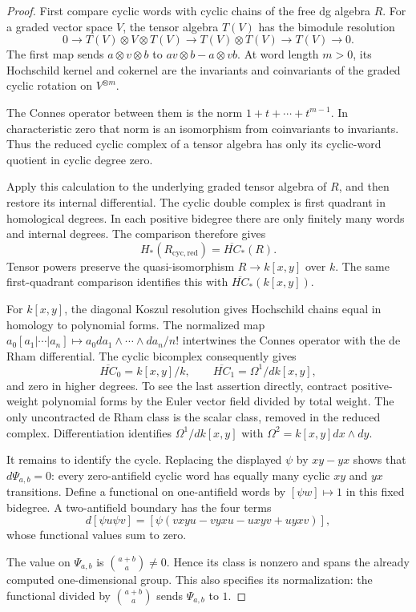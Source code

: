 \begin{proof}
First compare cyclic words with cyclic chains of the free
dg algebra $R$. For a graded vector space $V$, the tensor
algebra $T(V)$ has the bimodule resolution
\[
 0\longrightarrow T(V)\otimes V\otimes T(V)
 \longrightarrow T(V)\otimes T(V)
 \longrightarrow T(V)\longrightarrow0.
\]
The first map sends $a\otimes v\otimes b$ to
$av\otimes b-a\otimes vb$. At word length $m>0$, its
Hochschild kernel and cokernel are the invariants and
coinvariants of the graded cyclic rotation on $V^{\otimes m}$.

The Connes operator between them is the norm
$1+t+\cdots+t^{m-1}$. In characteristic zero that norm is an
isomorphism from coinvariants to invariants. Thus the reduced
cyclic complex of a tensor algebra has only its cyclic-word
quotient in cyclic degree zero.

Apply this calculation to the underlying graded tensor
algebra of $R$, and then restore its internal differential.
The cyclic double complex is first quadrant in homological
degrees. In each positive bidegree there are only finitely
many words and internal degrees. The comparison therefore
gives
\[
 H_*(R_{\mathrm{cyc,red}})=\overline{HC}_*(R).
\]
Tensor powers preserve the quasi-isomorphism
$R\to k[x,y]$ over $k$. The same first-quadrant comparison
identifies this with $\overline{HC}_*(k[x,y])$.

For $k[x,y]$, the diagonal Koszul resolution gives
Hochschild chains equal in homology to polynomial forms.
The normalized map
$a_0[a_1|\cdots|a_n]\mapsto a_0da_1\wedge\cdots\wedge da_n/n!$
intertwines the Connes operator with the de Rham differential.
The cyclic bicomplex consequently gives
\[
 \overline{HC}_0=k[x,y]/k,\qquad
 \overline{HC}_1=\Omega^1/dk[x,y],
\]
and zero in higher degrees. To see the last assertion
directly, contract positive-weight polynomial forms by the
Euler vector field divided by total weight. The only
uncontracted de Rham class is the scalar class, removed in
the reduced complex. Differentiation identifies
$\Omega^1/dk[x,y]$ with $\Omega^2=k[x,y]dx\wedge dy$.

It remains to identify the cycle. Replacing the displayed
$\psi$ by $xy-yx$ shows that $d\Psi_{a,b}=0$: every
zero-antifield cyclic word has equally many cyclic $xy$ and
$yx$ transitions. Define a functional on one-antifield
words by $[\psi w]\mapsto1$ in this fixed bidegree. A
two-antifield boundary has the four terms
\[
 d[\psi u\psi v]
   =[\psi(vxyu-vyxu-uxyv+uyxv)],
\]
whose functional values sum to zero. 

The value on
$\Psi_{a,b}$ is $\binom{a+b}{a}\ne0$. Hence its class is
nonzero and spans the already computed one-dimensional
group. This also specifies its normalization: the
functional divided by $\binom{a+b}{a}$ sends $\Psi_{a,b}$
to $1$.
\end{proof}

